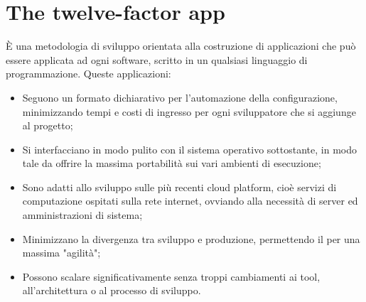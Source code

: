 \documentclass[PianoDiQualifica.tex]{subfiles}
\begin{document}
\chapter{The twelve-factor app}
\`{E} una metodologia di sviluppo orientata alla costruzione di applicazioni  che può essere applicata ad ogni software, scritto in un qualsiasi linguaggio di programmazione.
Queste applicazioni:
\begin{itemize}
\item Seguono un formato dichiarativo per l'automazione della configurazione, minimizzando tempi e costi di ingresso per ogni sviluppatore che si aggiunge al progetto;
\item Si interfacciano in modo pulito con il sistema operativo sottostante, in modo tale da offrire la massima portabilità sui vari ambienti di esecuzione;
\item Sono adatti allo sviluppo sulle più recenti cloud platform, cioè servizi di computazione ospitati sulla rete internet, ovviando alla necessità di server ed amministrazioni di sistema;
\item Minimizzano la divergenza tra sviluppo e produzione, permettendo il  per una massima "agilità";
\item Possono scalare significativamente senza troppi cambiamenti ai tool, all'architettura o al processo di sviluppo.
\end{itemize}
\end{document}
